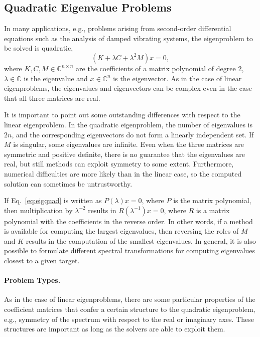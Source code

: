 \subsection{\label{sec:qep}Quadratic Eigenvalue Problems}

In many applications, e.g., problems arising from second-order differential equations such as the analysis of damped vibrating systems, the eigenproblem to be solved is quadratic,
\begin{equation}
(K+\lambda C+\lambda^2M)x=0,\label{eq:eigquad}
\end{equation}
where $K,C,M\in\mathbb{C}^{n\times n}$ are the coefficients of a matrix polynomial of degree 2, $\lambda\in\mathbb{C}$ is the eigenvalue and $x\in\mathbb{C}^n$ is the eigenvector. As in the case of linear eigenproblems, the eigenvalues and eigenvectors can be complex even in the case that all three matrices are real.

It is important to point out some outstanding differences with respect to the linear eigenproblem. In the quadratic eigenproblem, the number of eigenvalues is $2n$, and the corresponding eigenvectors do not form a linearly independent set. If $M$ is singular, some eigenvalues are infinite. Even when the three matrices are symmetric and positive definite, there is no guarantee that the eigenvalues are real, but still methods can exploit symmetry to some extent. Furthermore, numerical difficulties are more likely than in the linear case, so the computed solution can sometimes be untrustworthy.

If Eq.\ \ref{eq:eigquad} is written as $P(\lambda)x=0$, where $P$ is the matrix polynomial, then multiplication by $\lambda^{-2}$ results in $R(\lambda^{-1})x=0$, where $R$ is a matrix polynomial with the coefficients in the reverse order. In other words, if a method is available for computing the largest eigenvalues, then reversing the roles of $M$ and $K$ results in the computation of the smallest eigenvalues. In general, it is also possible to formulate different spectral transformations for computing eigenvalues closest to a given target.

\paragraph{Problem Types.}

As in the case of linear eigenproblems, there are some particular properties of the coefficient matrices that confer a certain structure to the quadratic eigenproblem, e.g., symmetry of the spectrum with respect to the real or imaginary axes. These structures are important as long as the solvers are able to exploit them.

